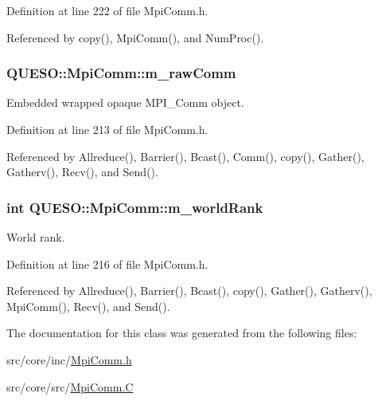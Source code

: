 Definition at line 222 of file Mpi\-Comm.\-h.



Referenced by copy(), Mpi\-Comm(), and Num\-Proc().

\hypertarget{class_q_u_e_s_o_1_1_mpi_comm_a990a22b37217ce6fc6a7c818c8d0106b}{
\subsubsection[{m\-\_\-raw\-Comm}]{ Q\-U\-E\-S\-O\-::\-Mpi\-Comm\-::m\-\_\-raw\-Comm\hspace{0.3cm}{\ttfamily [private]}}}\label{class_q_u_e_s_o_1_1_mpi_comm_a990a22b37217ce6fc6a7c818c8d0106b}


Embedded wrapped opaque M\-P\-I\-\_\-\-Comm object. 



Definition at line 213 of file Mpi\-Comm.\-h.



Referenced by Allreduce(), Barrier(), Bcast(), Comm(), copy(), Gather(), Gatherv(), Recv(), and Send().

\hypertarget{class_q_u_e_s_o_1_1_mpi_comm_aae8c456bc75534d43d682178bf98ef65}{
\subsubsection[{m\-\_\-world\-Rank}]{\setlength{\rightskip}{0pt plus 5cm}int Q\-U\-E\-S\-O\-::\-Mpi\-Comm\-::m\-\_\-world\-Rank\hspace{0.3cm}{\ttfamily [private]}}}\label{class_q_u_e_s_o_1_1_mpi_comm_aae8c456bc75534d43d682178bf98ef65}


World rank. 



Definition at line 216 of file Mpi\-Comm.\-h.



Referenced by Allreduce(), Barrier(), Bcast(), copy(), Gather(), Gatherv(), Mpi\-Comm(), Recv(), and Send().



The documentation for this class was generated from the following files\-:\begin{DoxyCompactItemize}
\item 
src/core/inc/\hyperlink{_mpi_comm_8h}{Mpi\-Comm.\-h}\item 
src/core/src/\hyperlink{_mpi_comm_8_c}{Mpi\-Comm.\-C}\end{DoxyCompactItemize}
